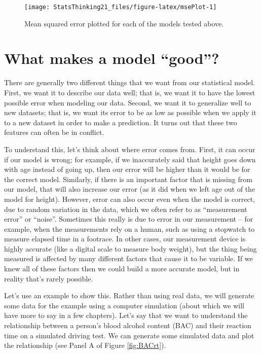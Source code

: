 \documentclass[
  12pt,
]{book}
\begin{document}
\begin{figure}
\texttt{[image: StatsThinking21\_files/figure-latex/msePlot-1]} \caption{Mean squared error plotted for each of the models tested above.}\label{fig:msePlot}
\end{figure}

\hypertarget{what-makes-a-model-good}{%
\section{What makes a model ``good''?}\label{what-makes-a-model-good}}

There are generally two different things that we want from our statistical model. First, we want it to describe our data well; that is, we want it to have the lowest possible error when modeling our data. Second, we want it to generalize well to new datasets; that is, we want its error to be as low as possible when we apply it to a new dataset in order to make a prediction. It turns out that these two features can often be in conflict.

To understand this, let's think about where error comes from. First, it can occur if our model is wrong; for example, if we inaccurately said that height goes down with age instead of going up, then our error will be higher than it would be for the correct model. Similarly, if there is an important factor that is missing from our model, that will also increase our error (as it did when we left age out of the model for height). However, error can also occur even when the model is correct, due to random variation in the data, which we often refer to as ``measurement error'' or ``noise''. Sometimes this really is due to error in our measurement -- for example, when the measurements rely on a human, such as using a stopwatch to measure elapsed time in a footrace. In other cases, our measurement device is highly accurate (like a digital scale to measure body weight), but the thing being measured is affected by many different factors that cause it to be variable. If we knew all of these factors then we could build a more accurate model, but in reality that's rarely possible.

Let's use an example to show this. Rather than using real data, we will generate some data for the example using a computer simulation (about which we will have more to say in a few chapters). Let's say that we want to understand the relationship between a person's blood alcohol content (BAC) and their reaction time on a simulated driving test. We can generate some simulated data and plot the relationship (see Panel A of Figure \ref{fig:BACrt}).
\end{document}
